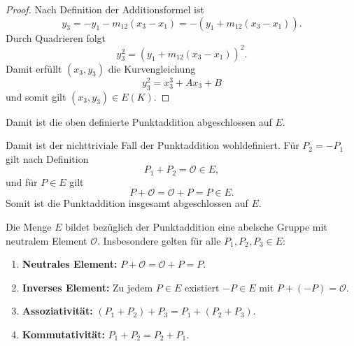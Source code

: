 \begin{proof}
    Nach Definition der Additionsformel ist
    \[
        y_3
        =
        -y_1-m_{12}(x_3-x_1)
        =
        -\left(y_1+m_{12}(x_3-x_1)\right).
    \]
    Durch Quadrieren folgt
    \[
        y_3^2
            =
            {\left(y_1+m_{12}(x_3-x_1)\right)}^2.
    \]
    Damit erfüllt \((x_3,y_3)\) die Kurvengleichung
    \[
        y_3^2=x_3^3+Ax_3+B
    \]
    und somit gilt \((x_3,y_3)\in E(K)\).
\end{proof}
Damit ist die oben definierte Punktaddition abgeschlossen auf \(E\).
\begin{bemerkung}\label{bem:sum-ist-identitaet}
    Damit ist der nichttriviale Fall der Punktaddition wohldefiniert.
    Für $P_2=-P_1$ gilt nach Definition
    \[
        P_1+P_2=\mathcal{O}\in E,
    \]
    und für $P\in E$ gilt
    \[
        P+\mathcal{O}=\mathcal{O}+P=P\in E.
    \]
    Somit ist die Punktaddition insgesamt abgeschlossen auf $E$.
\end{bemerkung}

\begin{theorem}\label{theo:eigenschaften-addition}
    Die Menge $E$ bildet bezüglich der Punktaddition eine abelsche Gruppe
    mit neutralem Element $\mathcal{O}$. Insbesondere gelten für alle
    $P_1,P_2,P_3\in E$:
    \begin{enumerate}
        \item[(i)] \textbf{Neutrales Element:}
              \(P+\mathcal{O}=\mathcal{O}+P=P\).

        \item[(ii)] \textbf{Inverses Element:}
              Zu jedem $P\in E$ existiert $-P\in E$ mit
              \(P+(-P)=\mathcal{O}\).

        \item[(iii)] \textbf{Assoziativität:}
              \((P_1+P_2)+P_3=P_1+(P_2+P_3)\).

        \item[(iv)] \textbf{Kommutativität:}
              \(P_1+P_2=P_2+P_1\).
    \end{enumerate}
\end{theorem}

